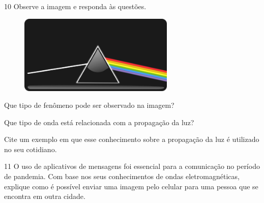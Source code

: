 \num{10} Observe a imagem e responda às questões.

\begin{figure}[htpb!]
\includegraphics[width=2.91389in,height=1.47847in]{./imgs/img8.png}
\end{figure}

\begin{escolha}
\item  Que tipo de fenômeno pode ser observado na imagem?



\item Que tipo de onda está relacionada com a propagação da luz?



\item Cite um exemplo em que esse conhecimento sobre a propagação da luz é utilizado no seu cotidiano.


\end{escolha}

\num{11} O uso de aplicativos de mensagens foi essencial para a comunicação no período de pandemia. Com base nos seus conhecimentos de ondas eletromagnéticas, explique como é possível enviar uma imagem pelo celular para uma pessoa que se encontra em outra cidade.



